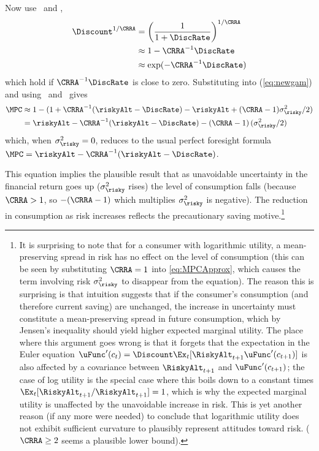 Now use \OverPlus~and \TaylorOne,
\begin{equation*}\begin{gathered}\begin{aligned}
        \Discount^{1/\CRRA} & =  \left(\frac{1}{1+\DiscRate}\right)^{1/\CRRA}
\\       & \approx  1-\CRRA^{-1}\DiscRate
\\       & \approx  \exp(-\CRRA^{-1}\DiscRate)
\end{aligned}\end{gathered}\end{equation*}
which hold if $\CRRA^{-1}\DiscRate$ is close to zero.  Substituting
into (\ref{eq:newgam}) and using \ExpPlus~and \LogEps~gives
\begin{equation}\begin{gathered}\begin{aligned}
        \MPC & \approx  1-(1+\CRRA^{-1}({\riskyAlt}-\DiscRate)-{\riskyAlt}+(\CRRA-1)\sigma_{\risky}^{2}/2)   \notag
\\       & =  {\riskyAlt}-\CRRA^{-1}({\riskyAlt}-\DiscRate) - \left(\CRRA-1\right)(\sigma_{\risky}^{2}/2) \label{eq:MPCApprox}
\end{aligned}\end{gathered}\end{equation}
which, when $\sigma^{2}_{\risky}=0$,  reduces to the usual perfect foresight formula $\MPC = \riskyAlt - \CRRA^{-1}(\riskyAlt - \DiscRate)$.

This equation implies the plausible result that as unavoidable
uncertainty in the financial return goes up ($\sigma_{\risky}^{2}$ rises) the level of
consumption falls (because $\CRRA>1$, so $-(\CRRA-1)$ which multiplies $\sigma_{\risky}^{2}$ is negative).  The reduction in consumption as risk increases reflects the precautionary
saving motive.\footnote{It is surprising to note that for a consumer with logarithmic utility, a mean-preserving spread in risk has no effect on the level of consumption (this can be seen by substituting $\CRRA=1$ into \eqref{eq:MPCApprox}, which causes the term involving risk $\sigma^{2}_{\risky}$ to disappear from the equation).  The reason this is surprising is that intuition suggests that if the consumer's consumption (and therefore current saving) are unchanged, the increase in uncertainty must constitute a mean-preserving spread in future consumption, which by Jensen's inequality should yield higher expected marginal utility.  The place where this argument goes wrong is that it forgets that the expectation in the Euler equation $\uFunc^{\prime}(c_{t})=\Discount \Ex_{t}[\RiskyAlt_{t+1} \uFunc^{\prime}(c_{t+1})]$ is also affected by a covariance between $\RiskyAlt_{t+1}$ and $\uFunc^{\prime}(c_{t+1})$; the case of log utility is the special case where this boils down to a constant times $\Ex_{t}[\RiskyAlt_{t+1}/\RiskyAlt_{t+1}]= 1$, which is why the expected marginal utility is unaffected by the unavoidable increase in risk.  This is yet another reason (if any more were needed) to conclude that logarithmic utility does not exhibit sufficient curvature to plausibly represent attitudes toward risk.  ($\CRRA \geq 2$ seems a plausible lower bound).}

